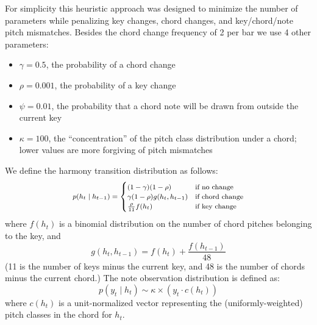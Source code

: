 \documentclass{article}
\begin{document}
For simplicity this heuristic approach was designed to minimize the number of parameters while penalizing key changes, chord changes, and key/chord/note pitch mismatches.  Besides the chord change frequency of 2 per bar we use 4 other parameters:
\begin{itemize}[nolistsep]
\item $\gamma = 0.5$, the probability of a chord change
\item $\rho = 0.001$, the probability of a key change
\item $\psi = 0.01$, the probability that a chord note will be drawn from outside the current key
\item $\kappa = 100$, the ``concentration'' of the pitch class distribution under a chord; lower values are more forgiving of pitch mismatches
\end{itemize}
We define the harmony transition distribution as follows:
\begin{equation}
    \medmath{p(h_t \mid h_{t-1}) =  \begin{cases}
    (1 - \gamma) (1 - \rho) & \textrm{if no change} \\
    \gamma (1 - \rho) g(h_t, h_{t-1}) & \textrm{if chord change} \\ 
    \frac{\rho}{11}f(h_t) & \textrm{if key change}
    \end{cases}}
\end{equation}
where $f(h_t)$ is a binomial distribution on the number of chord pitches belonging to the key, and
\begin{equation}
    g(h_t, h_{t-1}) = f(h_t) + \frac{f(h_{t-1})}{48}
\end{equation}
(11 is the number of keys minus the current key, and 48 is the number of chords minus the current chord.)  The note observation distribution is defined as:
\begin{equation}
    p(y_t \mid h_t) \sim \kappa \times \left(y_t \cdot c(h_t)\right)
\end{equation}
where $c(h_t)$ is a unit-normalized vector representing the (uniformly-weighted) pitch classes in the chord for $h_t$.

\end{document}
